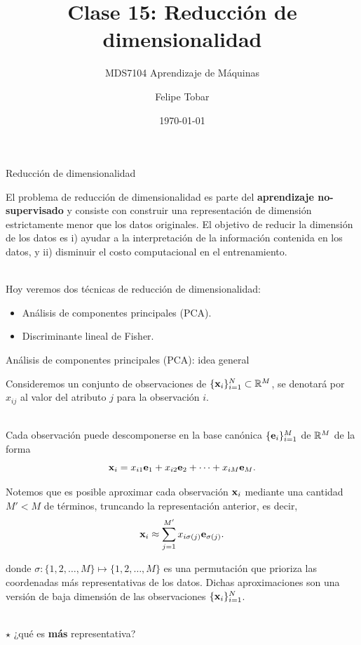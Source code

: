 \documentclass[9pt, handout]{beamer}
\title{Clase 15: Reducción de dimensionalidad}
\subtitle{MDS7104 Aprendizaje de Máquinas}
\date{\today}
\author{Felipe Tobar}
\institute{Iniciativa de Datos e Inteligencia Artificial\\Universidad de Chile}
\begin{document}
\begin{frame}
  \titlepage
\end{frame}

\begin{frame}{Reducción de dimensionalidad}

El problema de reducción de dimensionalidad es parte del \textbf{aprendizaje no-supervisado} y consiste con construir una representación de dimensión estrictamente menor que los datos originales. El objetivo de reducir la dimensión de los datos es i) ayudar a la interpretación de la información contenida en los datos, y ii) disminuir el costo computacional en el entrenamiento.\\~\ \pause

Hoy veremos dos técnicas de reducción de dimensionalidad:
  
\begin{itemize}
	\item Análisis de componentes principales (PCA).
	\item Discriminante lineal de Fisher.
\end{itemize}
	
\end{frame}

\begin{frame}{Análisis de componentes principales (PCA): idea general}

Consideremos un conjunto de observaciones de $\{\mathbf{x}_i\}_{i=1}^N\subset\mathbb{R}^M$, se denotará por $x_{ij}$ al valor del atributo $j$ para la observación $i$. \\~\ \pause

Cada observación puede descomponerse en la base canónica $\{\mathbf{e}_i\}_{i=1}^M$ de $\mathbb{R}^M$ de la forma 
\begin{equation*}
	\mathbf{x}_i = x_{i1}\mathbf{e}_1 +  x_{i2}\mathbf{e}_2 + \cdots + x_{iM}\mathbf{e}_M.	
\end{equation*}\pause

Notemos que es posible aproximar cada observación $\mathbf{x}_i$ mediante una cantidad $M'<M$ de términos, truncando la representación anterior, es decir,  
\begin{equation*}
	\mathbf{x}_i \approx \sum_{j=1}^{M'} x_{i\sigma(j)}\mathbf{e}_{\sigma(j)}.
\end{equation*}

donde $\sigma:\{1,2,\ldots,M\}\mapsto\{1,2,\ldots,M\}$ es una permutación que prioriza las coordenadas más representativas de los datos. Dichas aproximaciones son una versión de baja dimensión de las observaciones $\{\mathbf{x}_i\}_{i=1}^N$.\\~\ 

$\star$ ¿qué es \textbf{más} representativa?
\end{frame}
\end{document}
